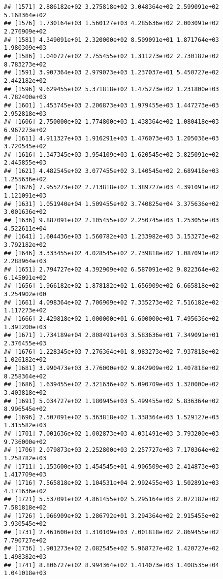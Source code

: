 \documentclass[]{article}
\begin{document}
\begin{verbatim}
## [1571] 2.886182e+02 3.275818e+02 3.048364e+02 2.599091e+02 5.168364e+02
## [1576] 1.730164e+03 1.560127e+03 4.285636e+02 2.003091e+02 2.276909e+02
## [1581] 4.349091e+01 2.320000e+02 8.509091e+01 1.871764e+03 1.980309e+03
## [1586] 1.040727e+02 2.755455e+02 1.311273e+02 2.730182e+02 8.783273e+02
## [1591] 3.907364e+03 2.979073e+03 1.237037e+01 5.450727e+02 2.442182e+02
## [1596] 9.629455e+02 5.371818e+02 1.475273e+02 1.231800e+03 4.782400e+03
## [1601] 1.453745e+03 2.206873e+03 1.979455e+03 1.447273e+03 2.952818e+03
## [1606] 2.750000e+02 1.774800e+03 1.438364e+02 1.080418e+03 6.967273e+02
## [1611] 4.911327e+03 1.916291e+03 1.476073e+03 1.205036e+03 3.720545e+02
## [1616] 1.347345e+03 3.954109e+03 1.620545e+02 3.825091e+02 2.445855e+03
## [1621] 4.482545e+02 3.077455e+02 3.140545e+02 2.689418e+03 1.255636e+02
## [1626] 7.955273e+02 2.713818e+02 1.389727e+03 4.391091e+02 1.121091e+03
## [1631] 1.051940e+04 1.509455e+02 3.740825e+04 3.375636e+02 3.001636e+02
## [1636] 9.887091e+02 2.105455e+02 2.250745e+03 1.253055e+03 4.522611e+04
## [1641] 1.604436e+03 1.560782e+03 1.233982e+03 3.153273e+02 3.792182e+02
## [1646] 3.333455e+02 4.028545e+02 2.739818e+02 1.087091e+02 2.288964e+03
## [1651] 2.794727e+02 4.392909e+02 6.587091e+02 9.822364e+02 6.145091e+02
## [1656] 1.966182e+02 1.878182e+02 1.656909e+02 6.665818e+02 3.254902e+00
## [1661] 4.098364e+02 7.706909e+02 7.335273e+02 7.516182e+02 1.117273e+02
## [1666] 2.429818e+02 1.000000e+01 6.600000e+01 7.495636e+02 1.391200e+03
## [1671] 1.734189e+04 2.808491e+03 3.583636e+01 7.349091e+01 2.376455e+03
## [1676] 1.228345e+03 7.276364e+01 8.983273e+02 7.937818e+02 1.026182e+02
## [1681] 3.990473e+03 3.776000e+02 9.842909e+02 1.407818e+02 8.258364e+02
## [1686] 1.639455e+02 2.321636e+02 5.090709e+03 1.320000e+02 3.403818e+02
## [1691] 5.034727e+02 1.180945e+03 5.499455e+02 5.836364e+02 8.996545e+02
## [1696] 2.507091e+02 5.363818e+02 1.338364e+03 1.529127e+03 1.315582e+03
## [1701] 7.001636e+02 1.002873e+03 4.031491e+03 3.793200e+03 9.736000e+02
## [1706] 2.079873e+03 2.252800e+03 2.257727e+03 7.170364e+02 1.258782e+03
## [1711] 1.153600e+03 1.454545e+01 4.906509e+03 2.414873e+03 1.417709e+03
## [1716] 7.565818e+02 1.104531e+04 2.992455e+03 1.502891e+03 4.171636e+02
## [1721] 5.537091e+02 4.861455e+02 5.295164e+03 2.072182e+02 7.581818e+02
## [1726] 1.966909e+02 1.286792e+01 3.294364e+02 2.915455e+02 3.930545e+02
## [1731] 2.461600e+03 1.310109e+03 7.001818e+02 2.869455e+02 7.790727e+02
## [1736] 1.901273e+02 2.082545e+02 5.968727e+02 1.420727e+02 1.498382e+03
## [1741] 8.806727e+02 8.994364e+02 1.414073e+03 1.408535e+04 1.041018e+03

\end{verbatim}
\end{document}
